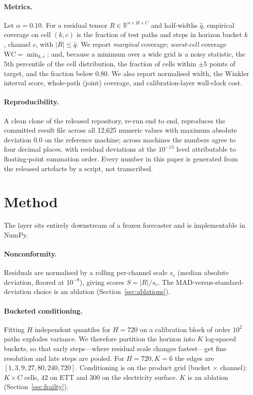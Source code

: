 \documentclass[11pt]{article}
\newcommand{\wc}{\mathrm{WC}}
\begin{document}
\paragraph{Metrics.} Let $\alpha=0.10$. For a residual tensor $R \in \mathbb{R}^{n \times H \times C}$ and half-widths $\hat q$, empirical coverage on cell $(k,c)$ is the fraction of test paths and steps in horizon bucket $k$, channel $c$, with $|R| \le \hat q$. We report \emph{marginal} coverage; \emph{worst-cell} coverage $\wc = \min_{k,c}$; and, because a minimum over a wide grid is a noisy statistic, the 5th percentile of the cell distribution, the fraction of cells within $\pm5$ points of target, and the fraction below 0.80. We also report normalised width, the Winkler interval score, whole-path (joint) coverage, and calibration-layer wall-clock cost.

\paragraph{Reproducibility.} A clean clone of the released repository, re-run end to end, reproduces the committed result file across all 12{,}625 numeric values with maximum absolute deviation $0.0$ on the reference machine; across machines the numbers agree to four decimal places, with residual deviations at the $10^{-13}$ level attributable to floating-point summation order. Every number in this paper is generated from the released artefacts by a script, not transcribed.

\section{Method}\label{sec:method}

The layer sits entirely downstream of a frozen forecaster and is implementable in NumPy.

\paragraph{Nonconformity.} Residuals are normalised by a rolling per-channel scale $s_c$ (median absolute deviation, floored at $10^{-8}$), giving scores $S = |R| / s_c$. The MAD-versus-standard-deviation choice is an ablation (Section~\ref{sec:ablations}).

\paragraph{Bucketed conditioning.} Fitting $H$ independent quantiles for $H=720$ on a calibration block of order $10^2$ paths explodes variance. We therefore partition the horizon into $K$ log-spaced buckets, so that early steps---where residual scale changes fastest---get fine resolution and late steps are pooled. For $H=720, K=6$ the edges are $[1,3,9,27,80,240,720]$. Conditioning is on the product grid (bucket $\times$ channel): $K \times C$ cells, $42$ on ETT and $300$ on the electricity surface. $K$ is an ablation (Section~\ref{sec:frailty}).
\end{document}
